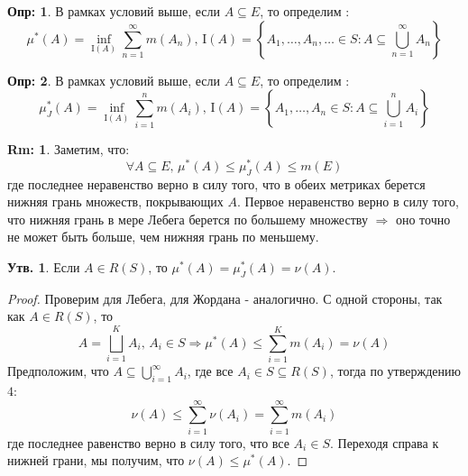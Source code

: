 \documentclass[12pt]{article}
\newcommand{\MI}{\mathrm{I}}
\theoremstyle{definition}
\newtheorem{defn}{Опр:}
\newtheorem{rem}{Rm:}
\newtheorem{prop}{Утв.}
\begin{document}
\begin{defn}
	В рамках условий выше, если $A \subseteq E$, то определим :
	$$
		\mu^*(A) = \inf\limits_{\MI(A)}\sum\limits_{n = 1}^{\infty}m(A_n) ,\, \MI(A) = \left\{A_1, \dotsc, A_n, \dotsc \in S \colon A \subseteq \bigcup\limits_{n = 1}^{\infty}A_n \right\} 
	$$
\end{defn}
\begin{defn}
	В рамках условий выше, если $A \subseteq E$, то определим :
	$$
	\mu_J^*(A) = \inf\limits_{\MI(A)}\sum\limits_{i = 1}^{n}m(A_i) ,\, \MI(A) = \left\{A_1, \dotsc, A_n \in S \colon A \subseteq \bigcup\limits_{i = 1}^{n}A_i \right\} 
	$$
\end{defn}
\begin{rem}
	Заметим, что:
	$$
		\forall A \subseteq E, \, \mu^*(A) \leq \mu_J^*(A) \leq m(E)
	$$
	где последнее неравенство верно в силу того, что в обеих метриках берется нижняя грань множеств, покрывающих $A$. Первое неравенство верно в силу того, что нижняя грань в мере Лебега берется по большему множеству $\Rightarrow$ оно точно не может быть больше, чем нижняя грань по меньшему.
\end{rem}
\begin{prop}
	Если $A \in R(S)$, то $\mu^*(A) = \mu_J^*(A) = \nu(A)$.
\end{prop}
\begin{proof}
	Проверим для Лебега, для Жордана - аналогично. С одной стороны, так как $A \in R(S)$, то 
	$$
		A = \bigsqcup\limits_{i = 1}^K A_i, \, A_i \in S \Rightarrow \mu^*(A) \leq \sum\limits_{i = 1}^{K} m(A_i) = \nu(A)
	$$
	Предположим, что $A \subseteq \bigcup\limits_{i = 1}^{\infty}A_i$, где все $A_i \in S \subseteq R(S)$, тогда по утверждению $4$:
	$$
		\nu(A) \leq \sum\limits_{i = 1}^{\infty}\nu(A_i) = \sum\limits_{i = 1}^{\infty}m(A_i)
	$$
	где последнее равенство верно в силу того, что все $A_i \in S$. Переходя справа к нижней грани, мы получим, что $\nu(A) \leq \mu^*(A)$.
\end{proof}
\end{document}
